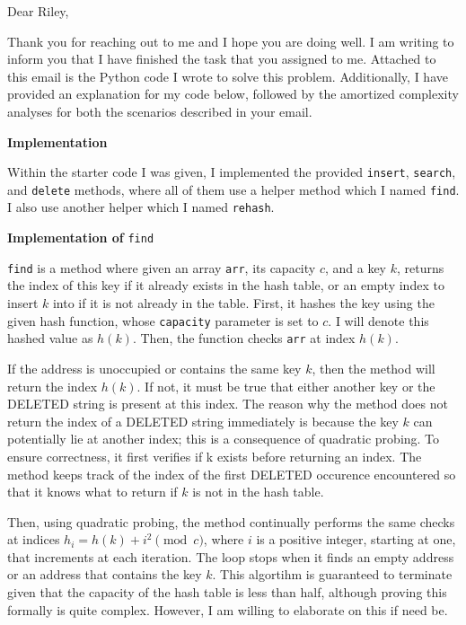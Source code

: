\documentclass[11pt]{article}
\begin{document}
    Dear Riley,

    \medskip

    Thank you for reaching out to me and I hope you are doing well. I am writing to inform you that I have finished the task that you assigned to me. Attached to this email is the Python code I wrote to solve this problem. Additionally, I have provided an explanation for my code below, followed by the amortized complexity analyses for both the scenarios described in your email.

    \medskip

    \textbf{Implementation}

    Within the starter code I was given, I implemented the provided \texttt{insert}, \texttt{search}, and \texttt{delete} methods, where all of them use a helper method which I named \texttt{find}. I also use another helper which I named \texttt{rehash}.

    \medskip

    \textbf{Implementation of} \texttt{find}

    \texttt{find} is a method where given an array \texttt{arr}, its capacity \(c\), and a key \(k\), returns the index of this key if it already exists in the hash table, or an empty index to insert \(k\) into if it is not already in the table. First, it hashes the key using the given hash function, whose \texttt{capacity} parameter is set to \(c\). I will denote this hashed value as \(h(k)\). Then, the function checks \texttt{arr} at index \(h(k)\).
    
    If the address is unoccupied or contains the same key \(k\), then the method will return the index \(h(k)\). If not, it must be true that either another key or the DELETED string is present at this index. The reason why the method does not return the index of a DELETED string immediately is because the key \(k\) can potentially lie at another index; this is a consequence of quadratic probing. To ensure correctness, it first verifies if k exists before returning an index. The method keeps track of the index of the first DELETED occurence encountered so that it knows what to return if \(k\) is not in the hash table.
    
    Then, using quadratic probing, the method continually performs the same checks at indices \(h_i = h(k) + i^2 \pmod c\), where \(i\) is a positive integer, starting at one, that increments at each iteration. The loop stops when it finds an empty address or an address that contains the key \(k\). This algortihm is guaranteed to terminate given that the capacity of the hash table is less than half, although proving this formally is quite complex. However, I am willing to elaborate on this if need be.
\end{document}

